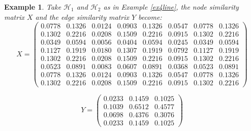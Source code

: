 \documentclass[a4paper,11pt]{report}
\newtheorem{example}[theorem]{Example}
\newcommand{\hgrafeen}{\mathcal{H}}
\begin{document}
\begin{example}
  Take $\hgrafeen_1$ and $\hgrafeen_2$ as in Example \ref{ex4line}, the node 
  similarity matrix $X$ and the edge similarity matrix $Y$ become:
  $$X=\begin{pmatrix}
  0.0778&0.1326&0.0124&0.0903&0.1326&0.0547&0.0778&0.1326\\
0.1302&0.2216&0.0208&0.1509&0.2216&0.0915&0.1302&0.2216\\
0.0349&0.0594&0.0056&0.0404&0.0594&0.0245&0.0349&0.0594\\
0.1127&0.1919&0.0180&0.1307&0.1919&0.0792&0.1127&0.1919\\
0.1302&0.2216&0.0208&0.1509&0.2216&0.0915&0.1302&0.2216\\
0.0523&0.0891&0.0083&0.0607&0.0891&0.0368&0.0523&0.0891\\
0.0778&0.1326&0.0124&0.0903&0.1326&0.0547&0.0778&0.1326\\
0.1302&0.2216&0.0208&0.1509&0.2216&0.0915&0.1302&0.2216
  \end{pmatrix}$$
  
    $$Y=\begin{pmatrix}
0.0233&0.1459&0.1025\\
0.1039&0.6512&0.4577\\
0.0698&0.4376&0.3076\\
0.0233&0.1459&0.1025
  \end{pmatrix}$$
  

\end{example}
\end{document}
